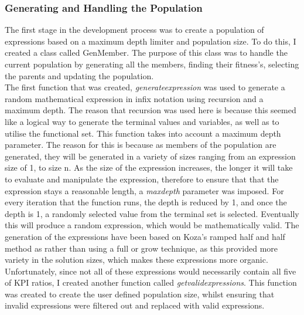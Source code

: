 \documentclass[11pt]{article}
\begin{document}
\subsubsection{Generating and Handling the Population}
The first stage in the development process was to create a population of expressions based on a maximum depth limiter and population size. To do this, I created a class called GenMember. The purpose of this class was to handle the current population by generating all the members, finding their fitness's, selecting the parents and updating the population.\\
The first function that was created, \textit{generate\textunderscore expression }was used to generate a random mathematical expression in infix notation using recursion and a maximum depth. The reason that recursion was used here is because this seemed like a logical way to generate the terminal values and variables, as well as to utilise the functional set. This function takes into account a maximum depth parameter. The reason for this is because as members of the population are generated, they will be generated in a variety of sizes ranging from an expression size of 1, to size n. As the size of the expression increases, the longer it will take to evaluate and manipulate the expression,  therefore to ensure that that the expression stays a reasonable length, a \textit{max\textunderscore depth} parameter was imposed. For every iteration that the function runs, the depth is reduced by 1, and once the depth is 1, a randomly selected value from the terminal set is selected. Eventually this will produce a random expression, which would be mathematically valid. The generation of the expressions have been based on Koza's ramped half and half method as rather than using a full or grow technique, as this provided more variety in the solution sizes, which makes these expressions more organic. Unfortunately, since not all of these expressions would  necessarily contain all five of KPI ratios, I created another function called \textit{get\textunderscore valid\textunderscore expressions}. This function was created to create the user defined population size, whilst ensuring that invalid expressions were filtered out and replaced with valid expressions.\\
\\
\end{document}
